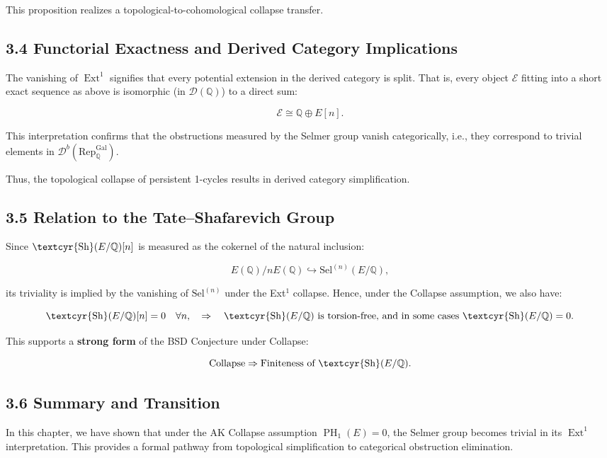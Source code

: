 \documentclass[11pt]{article}
\DeclareMathOperator{\Ext}{Ext}
\DeclareMathOperator{\PH}{PH}
\newcommand{\QQ}{\mathbb{Q}}
\newcommand{\Sha}{\text{\textcyr{Sh}}}
\begin{document}
This proposition realizes a topological-to-cohomological collapse transfer.

\subsection{3.4 Functorial Exactness and Derived Category Implications}

The vanishing of $\Ext^1$ signifies that every potential extension in the derived category is split. That is, every object $\mathcal{E}$ fitting into a short exact sequence as above is isomorphic (in $\mathcal{D}(\QQ)$) to a direct sum:

\[
\mathcal{E} \cong \QQ \oplus E[n].
\]

This interpretation confirms that the obstructions measured by the Selmer group vanish categorically, i.e., they correspond to trivial elements in $\mathcal{D}^b(\mathrm{Rep}_{\QQ}^{\text{Gal}})$.

Thus, the topological collapse of persistent 1-cycles results in derived category simplification.

\subsection{3.5 Relation to the Tate–Shafarevich Group}

Since $\Sha(E/\QQ)[n]$ is measured as the cokernel of the natural inclusion:

\[
E(\QQ)/nE(\QQ) \hookrightarrow \mathrm{Sel}^{(n)}(E/\QQ),
\]

its triviality is implied by the vanishing of $\mathrm{Sel}^{(n)}$ under the Ext$^1$ collapse.  
Hence, under the Collapse assumption, we also have:

\[
\Sha(E/\QQ)[n] = 0 \quad \forall n,
\quad \Rightarrow \quad \Sha(E/\QQ) \text{ is torsion-free, and in some cases } \Sha(E/\QQ) = 0.
\]

This supports a \textbf{strong form} of the BSD Conjecture under Collapse:

\[
\text{Collapse} \Rightarrow \text{Finiteness of } \Sha(E/\QQ).
\]

\subsection{3.6 Summary and Transition}

In this chapter, we have shown that under the AK Collapse assumption $\PH_1(E)=0$, the Selmer group becomes trivial in its $\Ext^1$ interpretation.  
This provides a formal pathway from topological simplification to categorical obstruction elimination.
\end{document}
